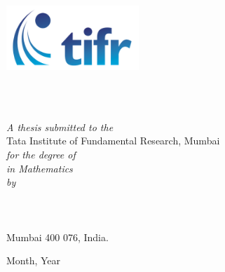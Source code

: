 \documentclass[11pt,english,
onehalfspacing,
headsepline]{thesis}
\author{Write Your Name} %
\numberwithin{equation}{subsection}
\theoremstyle{definition}
\begin{document}
\frontmatter %

\pagestyle{plain} 

\begin{titlepage}
\begin{center}

\vspace*{.03\textheight}
\includegraphics[width=50mm]{tifrlogo.png} %

\HRule \\[0.4cm] %
{\huge \bfseries \ttitle\par}\vspace{0.4cm} %
\HRule \\[1.5cm] %

\large \textit{A thesis submitted to the} \\ 
Tata Institute of Fundamental Research, Mumbai\\
\textit{for the degree of \degreename \\ in Mathematics \\ by}\\ [1.0cm] 

\Large \authorname \\ 
\large \deptname \\ \large \univname \\ Mumbai 400 076, India. 

\vfill

{\large Month, Year}\\[1cm] %

\end{center}

\end{titlepage}

\end{document}
